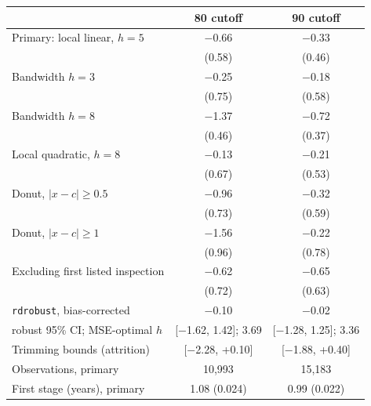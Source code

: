 \begin{tabular}{lcc}
\toprule
& 80 cutoff & 90 cutoff \\
\midrule
Primary: local linear, $h=5$ & $-$0.66 & $-$0.33 \\
 & (0.58) & (0.46) \\
Bandwidth $h=3$ & $-$0.25 & $-$0.18 \\
 & (0.75) & (0.58) \\
Bandwidth $h=8$ & $-$1.37 & $-$0.72 \\
 & (0.46) & (0.37) \\
Local quadratic, $h=8$ & $-$0.13 & $-$0.21 \\
 & (0.67) & (0.53) \\
Donut, $|x-c|\geq0.5$ & $-$0.96 & $-$0.32 \\
 & (0.73) & (0.59) \\
Donut, $|x-c|\geq1$ & $-$1.56 & $-$0.22 \\
 & (0.96) & (0.78) \\
Excluding first listed inspection & $-$0.62 & $-$0.65 \\
 & (0.72) & (0.63) \\
\texttt{rdrobust}, bias-corrected & $-$0.10 & $-$0.02 \\
\quad robust 95\% CI; MSE-optimal $h$ & [$-$1.62, 1.42]; 3.69 & [$-$1.28, 1.25]; 3.36 \\
Trimming bounds (attrition) & [$-$2.28, +0.10] & [$-$1.88, +0.40] \\
\midrule
Observations, primary & 10,993 & 15,183 \\
First stage (years), primary & 1.08 (0.024) & 0.99 (0.022) \\
\bottomrule
\end{tabular}
